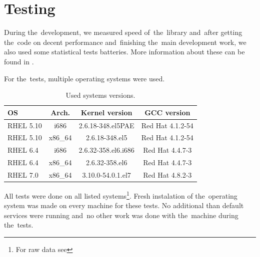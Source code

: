 \chapter{Testing} \label{chap:testing}
\par{
During the~development, we measured speed of~the~library and~after getting the~code on decent performance and~finishing the~main development work, we also used some statistical tests batteries. More information about these can be found in .
}
\par{
For the~tests, multiple operating systems were used.
\begin{table}[h!]
  \begin{center}
    \begin{tabular}{|l|c|c|c|}
      \hline
      OS & Arch. & Kernel version & GCC version\\
      \hline
      \hline
      RHEL 5.10 & i686 & 2.6.18-348.el5PAE & Red Hat 4.1.2-54\\
      \hline
      RHEL 5.10 & x86\_64 & 2.6.18-348.el5 & Red Hat 4.1.2-54\\
      \hline
      RHEL 6.4 & i686 & 2.6.32-358.el6.i686 & Red Hat 4.4.7-3\\
      \hline
      RHEL 6.4 & x86\_64 & 2.6.32-358.el6 & Red Hat 4.4.7-3\\
      \hline
      RHEL 7.0 & x86\_64 & 3.10.0-54.0.1.el7 & Red Hat 4.8.2-3\\
      \hline
    \end{tabular}
    \caption{Used systems versions.}
    \label{tab:testing:systems}
  \end{center}
\end{table}
}

\par{
All tests were done on all listed systems\footnote{For raw data see }. Fresh instalation of the~operating system was made on every machine for these tests. No additional than default services were running and~no other work was done with the~machine during the~tests.
}



